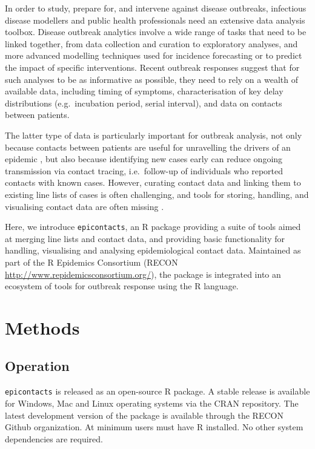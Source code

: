 \documentclass[9pt,a4paper,]{extarticle}
\theoremstyle{definition}
\theoremstyle{definition}
\theoremstyle{definition}
\theoremstyle{remark}
\begin{document}
In order to study, prepare for, and intervene against disease outbreaks, infectious disease modellers and public health professionals need an extensive data analysis toolbox. Disease outbreak analytics involve a wide range of tasks that need to be linked together, from data collection and curation to exploratory analyses, and more advanced modelling techniques used for incidence forecasting\citep{funk:2016}\citep{nouvellet:2017} or to predict the impact of specific interventions\citep{nouvellet:2015}\citep{parker:2015}. Recent outbreak responses suggest that for such analyses to be as informative as possible, they need to rely on a wealth of available data, including timing of symptoms, characterisation of key delay distributions (e.g.~incubation period, serial interval), and data on contacts between patients\citep{cauchemez:2014}\citep{aylward:2014}\citep{agua-agum:2015}\citep{cori:2017}.

The latter type of data is particularly important for outbreak analysis, not only because contacts between patients are useful for unravelling the drivers of an epidemic \citep{agua-agum:2016}\citep{cauchemez:2016}, but also because identifying new cases early can reduce ongoing transmission via contact tracing, i.e.~follow-up of individuals who reported contacts with known cases\citep{senga:2017}\citep{saurabh:2017}. However, curating contact data and linking them to existing line lists of cases is often challenging, and tools for storing, handling, and visualising contact data are often missing \citep{who:2009}\citep{rakesh:2014}.

Here, we introduce \texttt{epicontacts}, an R\citep{rcore} package providing a suite of tools aimed at merging line lists and contact data, and providing basic functionality for handling, visualising and analysing epidemiological contact data. Maintained as part of the R Epidemics Consortium (RECON \url{http://www.repidemicsconsortium.org/}), the package is integrated into an ecosystem of tools for outbreak response using the R language.

\section{Methods}\label{methods}

\subsection{Operation}\label{operation}

\texttt{epicontacts} is released as an open-source R package. A stable release is available for Windows, Mac and Linux operating systems via the CRAN repository. The latest development version of the package is available through the RECON Github organization. At minimum users must have R installed. No other system dependencies are required.
\end{document}
